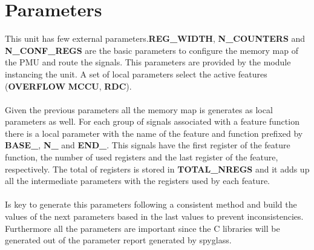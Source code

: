 \section{Parameters}
\label{chapter3}
This unit has few external parameters.\textbf{REG\_WIDTH}, \textbf{N\_COUNTERS} and \textbf{N\_CONF\_REGS} are the basic parameters to configure the memory map of the PMU and route the signals. This parameters are provided by the module instancing the unit. A set of local parameters select the active features (\textbf{OVERFLOW} \textbf{MCCU}, \textbf{RDC}).\\
\\
Given the previous parameters all the memory map is generates as local parameters as well. For each group of signals associated with a feature function there is a local parameter with the name of the feature and function prefixed by \textbf{BASE\_}, \textbf{N\_} and \textbf{END\_}. This signals have the first register of the feature function, the number of used registers and the last register of the feature, respectively. The total of registers is stored in \textbf{TOTAL\_NREGS} and it adds up all the intermediate parameters with the registers used by each feature.\\
\\
Is key to generate this parameters following a consistent method and build the values of the next parameters based in the last values to prevent inconsistencies. Furthermore all the parameters are important since the C libraries will be generated out of the parameter report generated by spyglass.